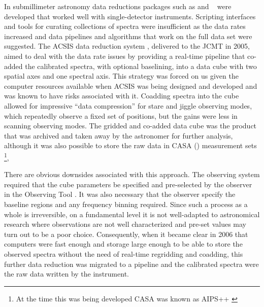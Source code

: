 \documentclass[final,authoryear,5p,times,twocolumn]{elsarticle}
\begin{document}
In submillimeter astronomy data reductions packages such as
\citep[][]{2005sf2a.conf..721P} and
\specx\ \citep[][]{SPECX} were developed that worked well with
single-detector instruments. Scripting interfaces and tools for
curating collections of spectra were insufficient as the data rates
increased and data pipelines \citep[e.g.,][]{1995ASPC...75..117W} and
algorithms that work on the full data set
\citep[e.g.,][]{2002ASPC..278..329M} were suggested. The ACSIS data
reduction system \citep{2000ASPC..216..502L,2000SPIE.4015..114H},
delivered to the JCMT in 2005, aimed to deal with the data rate issues
by providing a real-time pipeline that co-added the calibrated
spectra, with optional baselining, into a data cube with two spatial axes and one spectral axis.  This strategy
was forced on us given the computer resources available when ACSIS was
being designed and developed and was known to have risks associated
with it. Coadding spectra into the cube allowed for impressive ``data
compression'' for stare and jiggle observing modes, which repeatedly
observe a fixed set of positions, but the gains were less in scanning
observing modes.
The gridded and co-added data cube was the product that was archived
and taken away by the astronomer for further analysis, although it was
also possible to store the raw data in CASA () measurement sets
\citep{2012ASPC..461..849P}\footnote{At the time this was being
developed CASA was known as AIPS++ \citep{2004ASPC..314..468M}},

There are obvious downsides associated with this approach. The
observing system required that the cube parameters be specified and
pre-selected by the observer in the Observing Tool
\citep{2002ASPC..281..453F}. It was also
necessary that the observer specify the baseline regions and any
frequency binning required. Since such a process as a whole is
irreversible, on a fundamental level it is not well-adapted to
astronomical research where observations are not well characterized
and pre-set values may turn out to be a poor choice.  Consequently,
when it became clear in 2006 that computers were fast enough and storage
large enough to be able to store the observed spectra without the need
of real-time regridding and coadding, this further data reduction was
migrated to a pipeline and the calibrated spectra were the raw data
written by the instrument.
\end{document}
